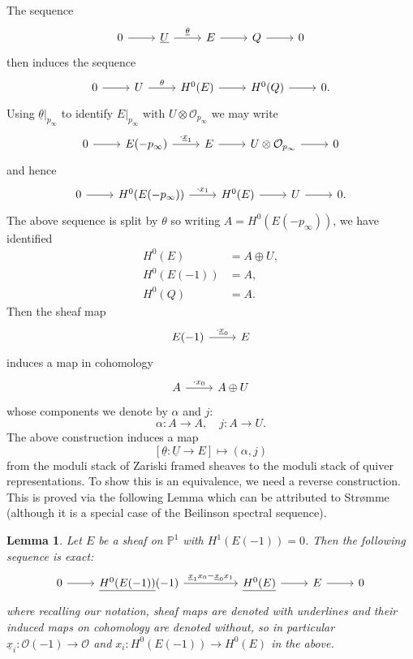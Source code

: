 \documentclass{amsart}
\newtheorem{lemma}[theorem]{Lemma}
\theoremstyle{definition}
\newcommand{\PP}{\mathbb{P}}
\newcommand{\OO}{\mathcal{O}}
\newcommand{\UL}[1]{\underline{#1}}
\begin{document}
The sequence
\[
\begin{tikzcd}
0\arrow[r]& \UL{U} \arrow{r}{\UL{\theta}} & E\arrow[r]&Q\arrow[r]&0
\end{tikzcd}
\]
then induces the sequence
\[
\begin{tikzcd}
0\arrow[r]& {U} \arrow{r}{{\theta}} &H^{0}(E)\arrow[r]&H^{0}(Q)\arrow[r]&0.
\end{tikzcd}
\]
Using $\UL{\theta}|_{p_{\infty}}$ to identify $E|_{p_{\infty}}$ with
$U\otimes \OO_{p_{\infty}}$ we may write
\[
\begin{tikzcd}
0\arrow[r]&E(-p_{\infty})\arrow{r}{\cdot \UL{x}_{1}}
&E\arrow[r]&U\otimes \OO_{p_{\infty}} \arrow[r] &0
\end{tikzcd}
\]
and hence
\[
\begin{tikzcd}
0\arrow[r]&H^{0}(E(-p_{\infty}))\arrow{r}{\cdot {x}_{1}}
&H^{0}(E)\arrow[r]&U \arrow[r] &0.
\end{tikzcd}
\]
The above sequence is split by $\theta$ so writing
$A=H^{0}(E(-p_{\infty}))$, we have identified
\begin{align*}
H^{0}(E) &= A\oplus U,\\
H^{0}(E(-1))&= A,\\
H^{0}(Q)&= A.
\end{align*}
Then the sheaf map
\[
\begin{tikzcd}
E(-1)\arrow{r}{\cdot \UL{x}_{0}}
&E
\end{tikzcd}
\]
induces a map in cohomology
\[
\begin{tikzcd}
A\arrow{r}{\cdot x_{0}} &A\oplus U
\end{tikzcd}
\]
whose components we denote by $\alpha$ and $j$:
\[
\alpha :A\to A, \quad j: A\to U.
\]
The above construction induces a map 
\[
[\UL{\theta}:\UL{U}\to E]\mapsto (\alpha ,j)
\]
from the moduli stack of Zariski framed sheaves to the moduli stack of
quiver representations. To show this is an equivalence, we need a
reverse construction. This is proved via the following Lemma which can
be attributed to Str\o mme \cite[Prop~1.1]{Stromme} (although it is a
special case of the Beilinson spectral sequence).
\begin{lemma}\label{lem: Stromme}
Let $E$ be a sheaf on $\PP^{1}$ with $H^{1}(E(-1))=0$. Then the following
sequence is exact:
\[
\begin{tikzcd}
0\arrow{r} & \UL{H^{0}(E(-1))}(-1)
\arrow{rr}{\UL{x}_{1}x_{0}-\UL{x}_{0}x_{1}}& &
\UL{H^{0}(E)} \arrow{r} & E\arrow[r] & 0
\end{tikzcd}
\]
where recalling our notation, sheaf maps are denoted with
underlines and their induced maps on cohomology are denoted without,
so in particular $\UL{x}_{i}:\OO (-1)\to \OO$ and
$x_{i}:H^{0}(E(-1))\to H^{0}(E)$ in the above.
\end{lemma}
\end{document}

